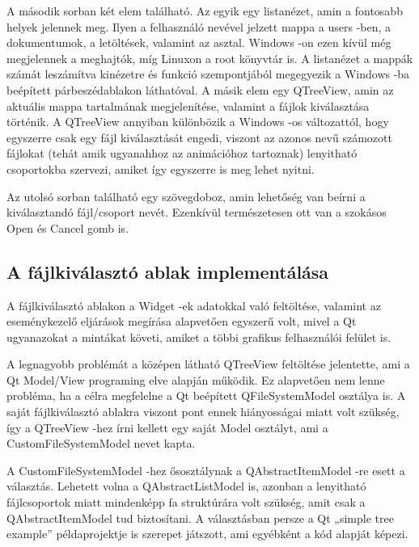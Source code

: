 A második sorban két elem található. 
Az egyik egy listanézet, 
amin a fontosabb helyek jelennek meg. 
Ilyen a felhasználó nevével jelzett mappa a users -ben, 
a dokumentumok, a letöltések, valamint az asztal. 
Windows -on ezen kívül még megjelennek a meghajtók, 
míg Linuxon a root könyvtár is. 
A listanézet a mappák számát leszámítva 
kinézetre és funkció szempontjából megegyezik 
a Windows -ba beépített párbeszédablakon láthatóval. 
A másik elem egy {\ttfamily QTreeView}, 
amin az aktuális mappa tartalmának megjelenítése,
valamint a fájlok kiválasztása történik.
A {\ttfamily QTreeView} annyiban különbözik a Windows -os változattól, 
hogy egyszerre csak egy fájl kiválasztását engedi, 
viszont az azonos nevű számozott fájlokat
(tehát amik ugyanahhoz az animációhoz tartoznak)
lenyitható csoportokba szervezi, 
amiket így egyszerre is meg lehet nyitni.

Az utolsó sorban található egy szövegdoboz,
amin lehetőség van beírni a kiválasztandó fájl/csoport nevét. 
Ezenkívül természetesen ott van a szokásos Open és Cancel gomb is.

\subsection{A fájlkiválasztó ablak implementálása}

A fájlkiválasztó ablakon a Widget -ek adatokkal való feltöltése, 
valamint az eseménykezelő eljárások megírása alapvetően egyszerű volt, 
mivel a Qt ugyanazokat a mintákat követi, 
amiket a többi grafikus felhasználói felület is.

A legnagyobb problémát a középen látható
{\ttfamily QTreeView} feltöltése jelentette, 
ami a Qt Model/View programing elve alapján működik. 
Ez alapvetően nem lenne probléma, 
ha a célra megfelelne a Qt beépített {\ttfamily QFileSystemModel} osztálya is. 
A saját fájlkiválasztó ablakra viszont pont ennek
hiányosságai miatt volt szükség,
így a {\ttfamily QTreeView} -hez írni kellett 
egy saját Model osztályt, 
ami a {\ttfamily CustomFileSystemModel} nevet kapta.

A {\ttfamily CustomFileSystemModel} -hez ősosztálynak 
a {\ttfamily QAbstractItemModel} -re esett a választás. 
Lehetett volna a {\ttfamily QAbstractListModel} is, 
azonban a lenyitható fájlcsoportok miatt mindenképp fa struktúrára volt szükség, 
amit csak a {\ttfamily QAbstractItemModel} tud biztosítani. 
A választásban persze a Qt „simple tree example” példaprojektje 
is szerepet játszott, 
ami egyébként a kód alapját képezi.

